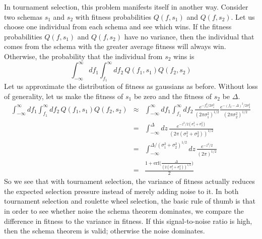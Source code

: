 In tournament selection, this problem manifests itself in another way.
Consider two schemas $s_1$ and $s_2$ with fitness probabilities
$Q(f,s_1)$ and $Q(f,s_2)$.  Let us choose one individual from each schema
and see which wins.  If the fitness probabilities $Q(f,s_1)$ and
$Q(f,s_2)$ have no variance, then the individual that comes from the
schema with the greater average fitness will always win.  Otherwise, the
probability that the individual from $s_2$ wins is
\begin{equation}
\int_{-\infty}^{\infty} {df_1
\int_{f_1}^{\infty} {df_2\,
Q(f_1,s_1) Q(f_2,s_2)}}
\end{equation}
Let us approximate the distribution of fitness as gaussians as before.
Without loss of generality, let us make the fitness of $s_1$ be zero
and the fitness of $s_2$ be $\Delta$.
\begin{eqnarray}
\int_{-\infty}^{\infty} {df_1
\int_{f_1}^{\infty} {df_2\,
Q(f_1,s_1) Q(f_2,s_2)}} &\approx&
\int_{-\infty}^{\infty} {df_1
\int_{f_1}^{\infty} {df_2\,
\frac{e^{-f_1^2/2\sigma_1^2}}{(2 \pi \sigma_1^2)^{1/2}}
\frac{e^{-(f_2-\Delta)^2/2\sigma_2^2}}{(2 \pi \sigma_2^2)^{1/2}}
}} \nonumber\\
&=& \int_{-\infty}^{\Delta}{dz\, \frac{e^{-z^2/2(\sigma_1^2+\sigma_2^2)}}{
	(2 \pi(\sigma_1^2+\sigma_2^2))^{1/2}}} \nonumber\\
&=& \int_{-\infty}^{\Delta/(\sigma_1^2+\sigma_2^2)^{1/2}}{dz\,
	\frac{e^{-z^2/2}}{(2\pi)^{1/2}}} \nonumber\\
&=& \frac{
	1+\mbox{erf}
	({\frac{\Delta}{(2(\sigma_1^2+\sigma_2^2))^{1/2}})}}{2}
\end{eqnarray}
So we see that with tournament selection, the variance of fitness actually
reduces the expected selection pressure instead of merely adding noise to it.
In both tournament selection and roulette wheel selection, the basic rule
of thumb is that in order to see whether noise the schema theorem dominates,
we compare the difference in fitness to the variance in fitness.  If this
signal-to-noise ratio is high, then the schema theorem is valid; otherwise
the noise dominates.

